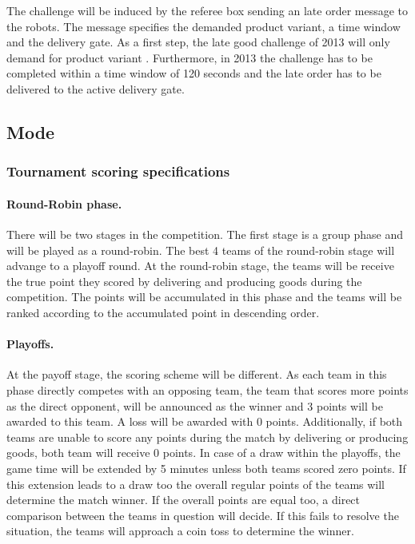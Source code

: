 \documentclass[12pt,twoside]{article}
\begin{document}
The challenge will be induced by the referee box sending an late order
message to the robots. The message specifies the demanded product
variant, a time window and the delivery gate. As a first step, the late
good challenge of 2013 will only demand for product variant
. Furthermore, in 2013 the challenge has to be completed within a
time window of 120 seconds and the late order has to be delivered to
the active delivery gate.

\subsection{Mode}
\subsubsection{Tournament scoring specifications}


\paragraph{Round-Robin phase.} 
There will be two stages in the competition. The first stage is a
group phase and will be played as a round-robin. The best 4 teams of
the round-robin stage will advange to a playoff round.
%
At the round-robin stage, the teams will be receive the true point
they scored by delivering and producing goods during the
competition. The points will be accumulated in this phase and the
teams will be ranked according to the accumulated point in descending
order.

\paragraph{Playoffs. } At the payoff stage, the scoring scheme will be
different. As each team in this phase directly competes with an
opposing team, the team that scores more points as the direct
opponent, will be announced as the winner and 3 points will be awarded
to this team. A loss will be awarded with 0 points. Additionally, if
both teams are unable to score any points during the match by
delivering or producing goods, both team will receive 0 points.
%
%
In case of a draw within the playoffs, the game time will be extended
by 5 minutes unless both teams scored zero points.
%
If this extension leads to a draw too the overall regular points of
the teams will determine the match winner. If the overall points are
equal too, a direct comparison between the teams in question will
decide. If this fails to resolve the situation, the teams will
approach a coin toss to determine the winner.
\end{document}
